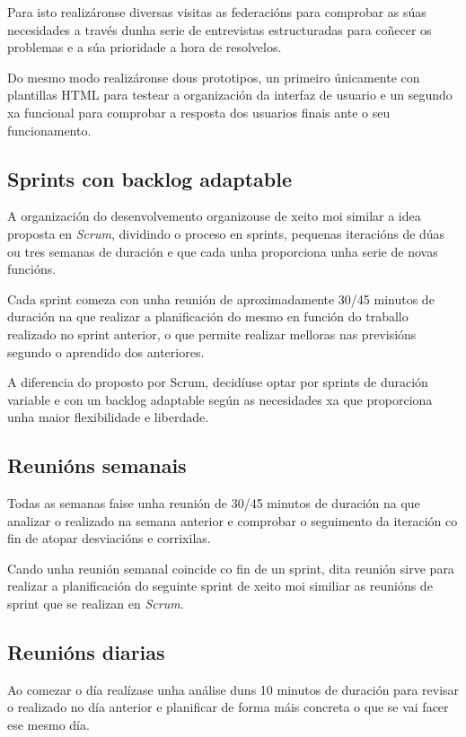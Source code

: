     Para isto realizáronse diversas visitas as federacións para comprobar as 
súas necesidades a través dunha serie de entrevistas estructuradas para 
coñecer os problemas e a súa prioridade a hora de resolvelos.

    Do mesmo modo realizáronse dous prototipos, un primeiro únicamente 
con plantillas HTML para testear a organización da interfaz de usuario e un 
segundo xa funcional para comprobar a resposta dos usuarios finais ante o seu 
funcionamento.

    \subsection{Sprints con backlog adaptable}
    A organización do desenvolvemento organizouse de xeito moi similar a idea 
proposta en \emph{Scrum}, dividindo o proceso en sprints, pequenas iteracións 
de dúas ou tres semanas de duración e que cada unha proporciona unha serie de 
novas funcións.

    Cada sprint comeza con unha reunión de aproximadamente 30/45 minutos de 
duración na que realizar a planificación do mesmo en función do 
traballo realizado no sprint anterior, o que permite realizar melloras nas 
previsións segundo o aprendido dos anteriores.

    A diferencia do proposto por Scrum, decidíuse optar por sprints de duración 
variable e con un backlog adaptable según as necesidades xa que proporciona 
unha maior flexibilidade e liberdade.

    \subsection{Reunións semanais}
    Todas as semanas faise unha reunión de 30/45 minutos de duración na que 
analizar o realizado na semana anterior e comprobar o seguimento da iteración 
co fin de atopar desviacións e corrixilas.

    Cando unha reunión semanal coincide co fin de un sprint, dita reunión 
sirve para realizar a planificación do seguinte sprint de xeito moi similiar as 
reunións de sprint que se realizan en \emph{Scrum}.

    \subsection{Reunións diarias}
    Ao comezar o día realízase unha análise duns 10 minutos de duración para 
revisar o realizado no día anterior e planificar de forma máis concreta o que 
se vai facer ese mesmo día.


